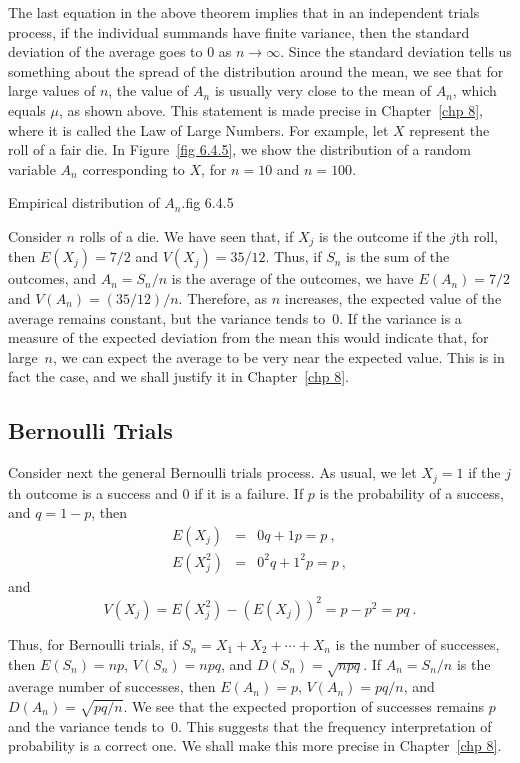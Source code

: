 The last equation in the above theorem implies that in an independent trials process,
if the individual summands have finite variance, then the standard deviation of the
average goes to 0 as $n \rightarrow \infty$.  Since the standard deviation tells us
something about the spread of the distribution around the mean, we see that for large
values of $n$, the value of $A_n$  is usually very close to the mean of $A_n$, which
equals $\mu$, as shown above.  This statement is made precise in Chapter~\ref{chp 8},
where it is called the Law of Large Numbers.  For example, let $X$ represent the roll
of a fair die.  In Figure~\ref{fig 6.4.5}, we show the distribution of a random variable
$A_n$ corresponding to $X$, for $n = 10$ and $n = 100$.

{Empirical distribution of $A_n$.}{fig 6.4.5}

\begin{example}\label{exam 6.14} Consider $n$ rolls of a die.  We have seen that, if
$X_j$ is the outcome if the
$j$th roll, then $E(X_j) = 7/2$ and $V(X_j) = 35/12$.  Thus, if $S_n$ is the sum of
the outcomes, and $A_n = S_n/n$ is the average of the outcomes, we have
$E(A_n) = 7/2$ and $V(A_n) = (35/12)/n$.  Therefore, as $n$ increases, the expected
value of the average remains constant, but the variance tends to~0.  If the variance
is a measure of the expected deviation from the mean this would indicate that, for
large~$n$, we can expect the average to be very near the expected value.  This is in
fact the case, and we shall justify it in Chapter~\ref{chp 8}.
\end{example}

\subsection*{Bernoulli Trials}

Consider next the general Bernoulli trials process.  As usual, we let $X_j = 1$ if
the $j$th outcome is a success and 0 if it is a failure.  If $p$ is the probability
of a success, and $q = 1 - p$, then
\begin{eqnarray*} E(X_j) & = & 0q + 1p = p\ , \\ E(X_j^2) & = & 0^2q + 1^2p = p\ ,
\end{eqnarray*} and
$$ V(X_j) = E(X_j^2) - (E(X_j))^2 = p - p^2 = pq\ .
$$

Thus, for Bernoulli trials, if $S_n = X_1 + X_2 +\cdots+ X_n$ is the number of
successes, then $E(S_n) = np$, $V(S_n) = npq$, and $D(S_n) = \sqrt{npq}.$  If
$A_n = S_n/n$ is the average number of successes, then $E(A_n) = p$, $V(A_n) = pq/n$,
and $D(A_n) = \sqrt{pq/n}$.  We see that the expected proportion of successes remains
$p$ and the variance tends to~0.  This suggests that the frequency interpretation of
probability is a correct one.  We shall make this more precise in Chapter~\ref{chp 8}.

